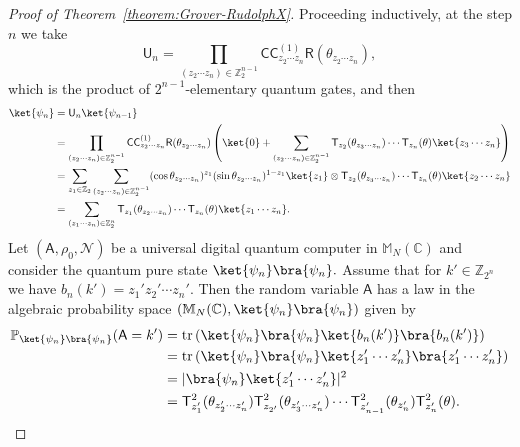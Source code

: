 \documentclass[a4paper,11pt]{article}
\DeclareMathOperator{\tr}{tr}
\newcommand{\rR}{\mathsf{R}}
\newcommand{\rU}{\mathsf{U}}
\newcommand{\rA}{\mathsf{A}}
\newcommand{\rC}{\mathsf{C}}
\newcommand{\rT}{\mathsf{T}}
\begin{document}
\begin{proof}[Proof of Theorem~\ref{theorem:Grover-RudolphX}]
Proceeding inductively, at the step $n$ we
take
$$
\rU_n = \prod_{(z_2 \cdots z_n) \in \mathbb{Z}_{2}^{n-1}}\rC\rC^{(1)}_{z_2 \cdots z_n}\rR(\theta_{z_2 \cdots z_n}),
$$
which is the product of $2^{n-1}$-elementary quantum gates, and then
\begin{align*}
    \ket{\psi_n} & = \rU_{n}\ket{\psi_{n-1}} \\
    & = \prod_{(z_2 \cdots z_n) \in \mathbb{Z}_{2}^{n-1}}\rC\rC^{(1)}_{z_2 \cdots z_n}\rR(\theta_{z_2 \cdots z_n}) \left( 
    \ket{0} + \sum_{(z_{2}\cdots z_n)\in \mathbb{Z}_{2}^{n-1}}\rT_{z_{2}}(\theta_{z_{3}\cdots z_n}) \cdots \rT_{z_n}(\theta)\ket{z_3 \cdots z_n}
    \right) \\
    & =  \displaystyle \sum_{z_1 \in \mathbb{Z}_2}\sum_{(z_{2}\cdots z_n)\in \mathbb{Z}_{2}^{n-1}} (\cos \theta_{z_2\cdots z_n})^{z_1} (\sin \theta_{z_2\cdots z_n})^{1-z_1} \ket{z_1} \otimes  \rT_{z_{2}}(\theta_{z_{3}\cdots z_n})\cdots \rT_{z_n}(\theta)\ket{z_2 \cdots z_n} \\
    & = \displaystyle  \sum_{(z_{1}\cdots z_n)\in \mathbb{Z}_{2}^{n}}\rT_{z_{1}}(\theta_{z_{2}\cdots z_n}) \cdots \rT_{z_n}(\theta)\ket{z_1 \cdots z_n}.
 \end{align*}
 Let $(\rA,\rho_0,\mathcal{N})$ be a universal digital quantum computer in $\mathbb{M}_N(\mathbb{C})$ and consider the quantum pure state $\ket{\psi_n}\bra{\psi_n}.$  Assume that for $k' \in \mathbb{Z}_{2^n}$ we have $b_n(k')=z_1'z_2'\cdots z_n'.$ Then the random variable $\rA$ has a law in the algebraic probability space $(\mathbb{M}_N(\mathbb{C}),\ket{\psi_n}\bra{\psi_n})$ given by
\begin{align*}
\mathbb{P}_{\ket{\psi_n}\bra{\psi_n}}(\rA = k') & = 
\tr\left(\ket{\psi_n}\bra{\psi_n}\ket{b_n(k')}\bra{b_n(k')}\right) \\
& = \tr\left(\ket{\psi_n}\bra{\psi_n}\ket{z_1'\cdots z_n'}\bra{z_1'\cdots z_n'}\right)  
\\
& =|\bra{\psi_n} \ket{z_1'\cdots z_n'}|^2 \\ 
& =\rT_{z_1'}^2(\theta_{z_{2}'\cdots z_n'})\rT_{z_{2'}}^2(\theta_{z_{3}'\cdots z_n'}) \cdots \rT_{z_{n-1}'}^2(\theta_{z_n'})\rT_{z_n'}^2(\theta).
\end{align*}


\end{proof}
\end{document}
